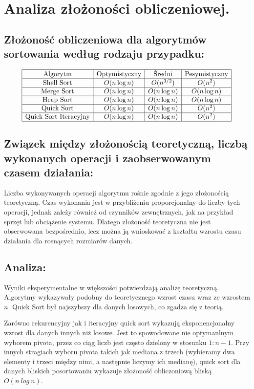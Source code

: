 \documentclass[11pt]{article}
\begin{document}
	\section{Analiza złożoności obliczeniowej.}
	\subsection{Złożoność obliczeniowa dla algorytmów sortowania według rodzaju przypadku:}
	$$
	\begin{array}{|c|c|c|c|}
		\hline
		\text{Algorytm} & \text{Optymistyczny} & \text{Średni} & \text{Pesymistyczny} \\
		\hline
		\text{Shell Sort} & O(n \log n) & O(n^{3/2}) & O(n^{2}) \\
		\hline
		\text{Merge Sort} & O(n \log n) & O(n \log n) & O(n \log n) \\
		\hline
		\text{Heap Sort} & O(n \log n) & O(n \log n) & O(n \log n) \\
		\hline
		\text{Quick Sort} & O(n \log n) & O(n \log n) & O(n^{2}) \\
		\hline
		\text{Quick Sort Iteracyjny} & O(n \log n) & O(n \log n) & O(n^{2}) \\
		\hline
	\end{array}
	$$
	
	\subsection{Związek między złożonością teoretyczną, liczbą wykonanych operacji i zaobserwowanym czasem działania:}
	
	Liczba wykonywanych operacji algorytmu rośnie zgodnie z jego złożonością teoretyczną. Czas wykonania jest w przybliżeniu proporcjonalny do liczby tych operacji, jednak zależy również od czynników zewnętrznych, jak na przykład sprzęt lub obciążenie systemu. Dlatego złożoność teoretyczna nie jest obserwowana bezpośrednio, lecz można ją wnioskować z kształtu wzrostu czasu działania dla rosnących rozmiarów danych.
	
	\subsection{Analiza:}
	Wyniki eksperymentalne w większości potwierdzają analizę teoretyczną. Algorytmy wykazywały podobny do teoretycznego wzrost czasu wraz ze wzrostem $n$. Quick Sort był najszybszy dla danych losowych, co zgadza się z teorią.
	
	Zarówno rekurencyjny jak i iteracyjny quick sort wykazują eksponencjonalny wzrost dla danych innych niż losowe. Jest to spowodowane nie optymanlnym wyborem pivota, przez co ciąg liczb jest często dzielony w stosunku $1 : n - 1$. Przy innych stragiach wyboru pivota takich jak mediana z trzech (wybieramy dwa elementy i trzeci między nimi, a następnie liczymy ich medianę), quick sort dla danych bliskich posortowaniu wykazuje złożoność obliczoniową bliską $O(n\ log\ n)$.
	
\end{document}

